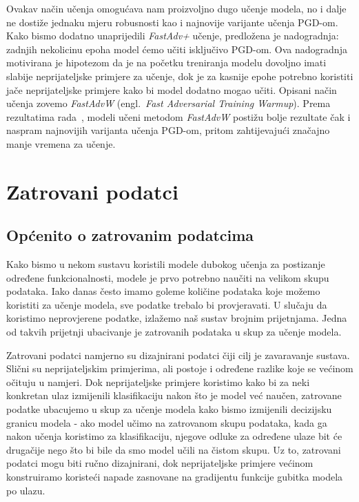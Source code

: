 \documentclass[times, utf8, zavrsni, numeric]{fer}
\begin{document}
\pagebreak

Ovakav način učenja omogućava nam proizvoljno dugo učenje modela, no i dalje ne dostiže jednaku mjeru robusnosti kao i najnovije varijante učenja PGD-om.
Kako bismo dodatno unaprijedili \textit{FastAdv+} učenje, predložena je nadogradnja: zadnjih nekolicinu epoha model ćemo učiti isključivo PGD-om. 
Ova nadogradnja motivirana je hipotezom da je na početku treniranja modelu dovoljno imati slabije neprijateljske primjere za učenje, 
dok je za kasnije epohe potrebno koristiti jače neprijateljske primjere kako bi model dodatno mogao učiti. Opisani način učenja zovemo \textit{FastAdvW} (engl.\ \textit{Fast Adversarial Training Warmup}).
Prema rezultatima rada~\cite{li2020towards}, modeli učeni metodom \textit{FastAdvW} postižu bolje rezultate čak i naspram najnovijih varijanta učenja PGD-om, 
pritom zahtijevajući značajno manje vremena za učenje.

\chapter{Zatrovani podatci}

\section{Općenito o zatrovanim podatcima}

Kako bismo u nekom sustavu koristili modele dubokog učenja za postizanje određene funkcionalnosti, modele je prvo potrebno naučiti na velikom skupu podataka. 
Iako danas često imamo goleme količine podataka koje možemo koristiti za učenje modela, sve podatke trebalo bi provjeravati.
U slučaju da koristimo neprovjerene podatke, izlažemo naš sustav brojnim prijetnjama.
Jedna od takvih prijetnji ubacivanje je zatrovanih podataka u skup za učenje modela. 

Zatrovani podatci namjerno su dizajnirani podatci čiji cilj je zavaravanje sustava.
Slični su neprijateljskim primjerima, ali postoje i određene razlike koje se većinom očituju u namjeri.
Dok neprijateljske primjere koristimo kako bi za neki konkretan ulaz izmijenili klasifikaciju nakon što je model već naučen,
zatrovane podatke ubacujemo u skup za učenje modela kako bismo izmijenili decizijsku granicu modela - ako model učimo na zatrovanom skupu podataka,
kada ga nakon učenja koristimo za klasifikaciju, njegove odluke za određene ulaze bit će drugačije nego što bi bile da smo model učili na čistom skupu.
Uz to, zatrovani podatci mogu biti ručno dizajnirani, dok neprijateljske primjere većinom konstruiramo koristeći napade zasnovane na gradijentu funkcije gubitka modela po ulazu.
\end{document}
